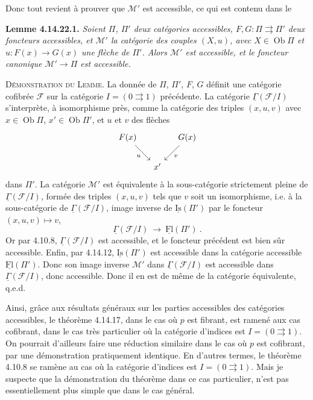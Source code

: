 \documentclass[11pt]{article}
\newcommand{\printedpage}[1]{\marginpar{\footnotesize p.~#1}}
\newcommand{\msp}[1]{\marginpar{\footnotesize [#1]}}
\newcommand{\Ob}{\operatorname{Ob}}
\newcommand{\uFl}{\underline{\mathrm{Fl}}}
\newcommand{\uIs}{\underline{\mathrm{Is}}}
\newcommand{\uGamma}{\underline{\Gamma}}
\begin{document}
Donc tout revient à prouver que $\mathcal{M}'$ est accessible, ce qui est contenu dans le

\textbf{Lemme 4.14.22.1.} \textit{Soient $\Pi$, $\Pi'$ deux catégories accessibles, $F,G:\Pi\rightrightarrows\Pi'$ deux foncteurs accessibles, et $\mathcal{M}'$ la catégorie des couples $(X,u)$, avec $X\in\Ob\Pi$ et $u:F(x)\longrightarrow G(x)$ une flèche de $\Pi'$. Alors $\mathcal{M}'$ est accessible, et le foncteur canonique $\mathcal{M}'\longrightarrow\Pi$ est accessible.} %

\textsc{Démonstration du Lemme.} La donnée de $\Pi$, $\Pi'$, $F$, $G$ définit une catégorie cofibrée $\mathcal{F}$ sur la catégorie $I=(0\rightrightarrows 1)$
\msp{page 407}
précédente. La catégorie $\uGamma(\mathcal{F}/I)$ s'interprète, à isomorphisme près, comme la catégorie des triples $(x,u,v)$ avec $x\in\Ob\Pi$, $x'\in\Ob\Pi'$, et $u$ et $v$ des flèches
\[
\begin{tikzcd}[column sep=small]
F(x) \arrow[dr, "u"'] & & G(x) \arrow[dl, "v"] \\
& x' &
\end{tikzcd}
\]
dans $\Pi'$. La catégorie $\mathcal{M}'$ est équivalente à la sous-catégorie strictement pleine de $\uGamma(\mathcal{F}/I)$, formée des triples $(x,u,v)$ tels que $v$ soit un isomorphisme, i.e. à la sous-catégorie de $\uGamma(\mathcal{F}/I)$, image inverse de $\uIs(\Pi')$ par le foncteur $(x,u,v)\longmapsto v$,
\[
\uGamma(\mathcal{F}/I)\ \longrightarrow\ \uFl(\Pi')\ .
\]
Or par 4.10.8, $\uGamma(\mathcal{F}/I)$ est accessible, et le foncteur précédent est bien sûr accessible. Enfin, par 4.14.12,
\msp{page 408}
$\uIs(\Pi')$ est accessible dans la catégorie accessible $\uFl(\Pi')$. Donc son image inverse $\mathcal{M}'$ dans $\uGamma(\mathcal{F}/I)$ est accessible dans $\uGamma(\mathcal{F}/I)$, donc accessible. Donc il en est de même de la catégorie équivalente, q.e.d.

Ainsi, grâce aux résultats généraux sur les parties accessibles des catégories accessibles, le théorème 4.14.17, dans le cas où $p$ est fibrant, est ramené aux cas cofibrant, dans le cas très particulier où la catégorie d'indices est $I=(0\rightrightarrows 1)$. On pourrait d'ailleurs faire une réduction similaire dans le cas où $p$ est cofibrant, par une démonstration pratiquement %
\printedpage{155}
identique. En d'autres termes, le théorème 4.10.8 se ramène au cas où la catégorie d'indices est $I=(0\rightrightarrows 1)$. Mais je suspecte que la démonstration du théorème dans ce cas particulier, n'est pas essentiellement plus simple que dans le cas général.
\end{document}
